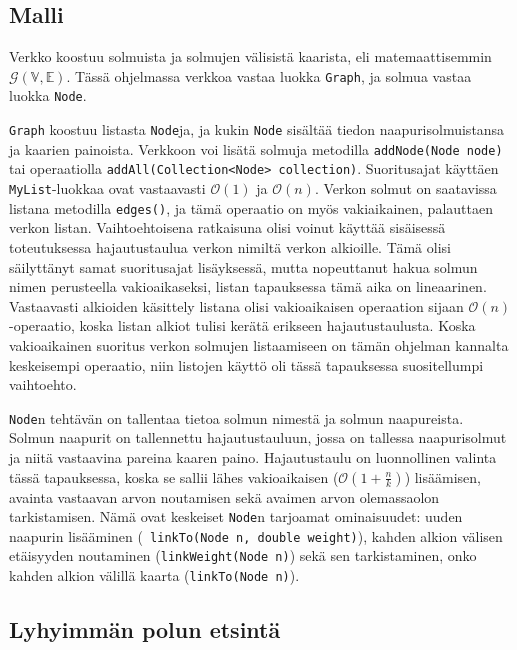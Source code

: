 \documentclass[10pt,a4paper]{article}
\begin{document}
\subsection{Malli}
\label{model.graph}

Verkko koostuu solmuista ja solmujen välisistä kaarista, eli matemaattisemmin $\mathcal{G}( \mathbb{V}, \mathbb{E})$. Tässä ohjelmassa verkkoa vastaa luokka \texttt{Graph}, ja solmua vastaa luokka \texttt{Node}.

\texttt{Graph} koostuu listasta \texttt{Node}ja, ja kukin \texttt{Node} sisältää tiedon naapurisolmuistansa ja kaarien painoista. Verkkoon voi lisätä solmuja metodilla \texttt{addNode(Node node)} tai operaatiolla \texttt{addAll(Collection<Node> collection)}. Suoritusajat käyttäen \texttt{MyList}-luokkaa ovat vastaavasti $\mathcal{O}(1)$ ja $\mathcal{O}(n)$. Verkon solmut on saatavissa listana metodilla \texttt{edges()}, ja tämä operaatio on myös vakiaikainen, palauttaen verkon listan. Vaihtoehtoisena ratkaisuna olisi voinut käyttää sisäisessä toteutuksessa hajautustaulua verkon nimiltä verkon alkioille. Tämä olisi säilyttänyt samat suoritusajat lisäyksessä, mutta nopeuttanut hakua solmun nimen perusteella vakioaikaseksi, listan tapauksessa tämä aika on lineaarinen. Vastaavasti alkioiden käsittely listana olisi vakioaikaisen operaation sijaan $\mathcal{O}(n)$-operaatio, koska listan alkiot tulisi kerätä erikseen hajautustaulusta. Koska vakioaikainen suoritus verkon solmujen listaamiseen on tämän ohjelman kannalta keskeisempi operaatio, niin listojen käyttö oli tässä tapauksessa suositellumpi vaihtoehto.

\texttt{Node}n tehtävän on tallentaa tietoa solmun nimestä ja solmun naapureista. Solmun naapurit on tallennettu hajautustauluun, jossa on tallessa naapurisolmut ja niitä vastaavina pareina kaaren paino. Hajautustaulu on luonnollinen valinta tässä tapauksessa, koska se sallii lähes vakioaikaisen ($\mathcal{O}(1 + \frac{n}{k})$) lisäämisen, avainta vastaavan arvon noutamisen sekä avaimen arvon olemassaolon tarkistamisen. Nämä ovat keskeiset \texttt{Node}n tarjoamat ominaisuudet: uuden naapurin lisääminen (\texttt{ linkTo(Node n, double weight)}), kahden alkion välisen etäisyyden noutaminen (\texttt{linkWeight(Node n)}) sekä sen tarkistaminen, onko kahden alkion välillä kaarta (\texttt{linkTo(Node n)}).

\subsection{Lyhyimmän polun etsintä}
\label{path}
\end{document}
